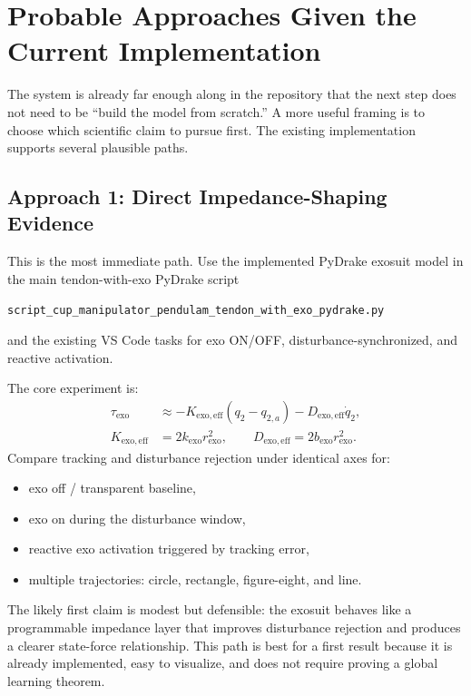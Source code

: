 \documentclass[11pt]{article}
\begin{document}
\pagebreak 
\section{Probable Approaches Given the Current Implementation}
The system is already far enough along in the repository that the next step does not need to be ``build the model from scratch.''  A more useful framing is to choose which scientific claim to pursue first.  The existing implementation supports several plausible paths.

\subsection{Approach 1: Direct Impedance-Shaping Evidence}
This is the most immediate path.  Use the implemented PyDrake exosuit model in the main tendon-with-exo PyDrake script
\begin{center}
\small\texttt{script\_cup\_manipulator\_pendulam\_tendon\_with\_exo\_pydrake.py}
\end{center}
and the existing VS Code tasks for exo ON/OFF, disturbance-synchronized, and reactive activation.

The core experiment is:
\begin{align}
    \tau_{\mathrm{exo}} &\approx -K_{\mathrm{exo,eff}}(q_2-q_{2,a}) - D_{\mathrm{exo,eff}}\dot{q}_2, \\
    K_{\mathrm{exo,eff}} &= 2k_{\mathrm{exo}}r_{\mathrm{exo}}^2, \qquad
    D_{\mathrm{exo,eff}} = 2b_{\mathrm{exo}}r_{\mathrm{exo}}^2 .
\end{align}
Compare tracking and disturbance rejection under identical axes for:
\begin{itemize}[leftmargin=1.5em]
    \item exo off / transparent baseline,
    \item exo on during the disturbance window,
    \item reactive exo activation triggered by tracking error,
    \item multiple trajectories: circle, rectangle, figure-eight, and line.
\end{itemize}

The likely first claim is modest but defensible: the exosuit behaves like a programmable impedance layer that improves disturbance rejection and produces a clearer state-force relationship.  This path is best for a first result because it is already implemented, easy to visualize, and does not require proving a global learning theorem.
\end{document}

